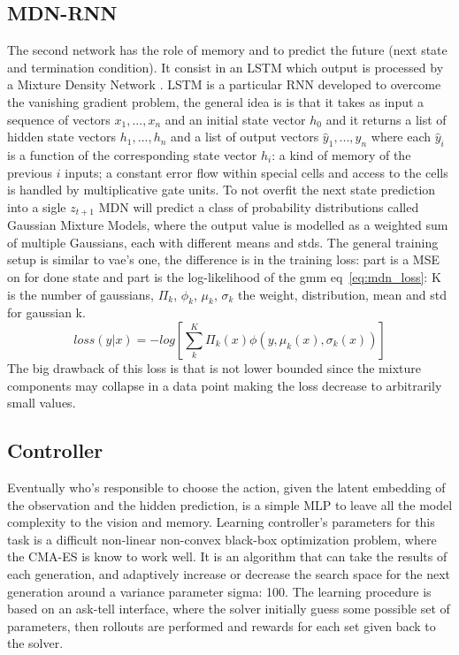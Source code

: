 \documentclass{article}
\begin{document}
\subsection{MDN-RNN}
The second network has the role of memory and to predict the future (next state and termination condition). It consist in an LSTM \cite{lstm} which output is processed by a Mixture Density Network \cite{mdn}. 
LSTM is a particular RNN developed to overcome the vanishing gradient problem, the general idea is  is that it takes as input a sequence of vectors $x_1, ..., x_n$ and an initial state vector $h_0$ and it returns a list of hidden state vectors $h_1, ..., h_n$ and a list of output vectors $\hat{y}_1, ..., \hat{y}_n$ where each $\hat{y}_i$ is a function of the corresponding state vector $h_i$: a kind of memory of the previous $i$ inputs; a constant error flow within special cells and access to the cells is handled by multiplicative gate units.
To not overfit the next state prediction into a sigle $z_{t+1}$ MDN will predict a class of probability distributions called Gaussian Mixture Models, where the output value is modelled as a weighted sum of multiple Gaussians, each with different means and stds.
The general training setup is similar to vae's one, the difference is in the training loss: part is a MSE on for done state
 and part is the log-likelihood of the gmm eq~\ref{eq:mdn_loss}: K is the number of gaussians, $\Pi_k$, $\phi_k $, $\mu_k$, $\sigma_k$ the weight, distribution, mean and std for gaussian k.
\begin{equation}\label{eq:mdn_loss}
loss(y | x) = -log[ \sum_{k}^{K} \Pi_{k}(x) \phi(y, \mu_{k}(x), \sigma_{k}(x))]
\end{equation}
The big drawback of this loss is that is not lower bounded since the mixture components may collapse in a data point making the loss decrease to arbitrarily small values.
\subsection{Controller}
Eventually who's responsible to choose the action, given the latent embedding of the observation and the hidden prediction, is a simple MLP to leave all the model complexity to the vision and memory.
Learning controller's parameters for this task is a difficult non-linear non-convex black-box optimization problem, where the CMA-ES \cite{cmaes} is know to work well.
It is an algorithm that can take the results of each generation, and adaptively increase or decrease the search space for the next generation around a variance parameter sigma: 100.
The learning procedure is based on an ask-tell interface, where the solver initially guess some possible set of parameters, then rollouts are performed and rewards for each set given back to the solver.
\end{document}
